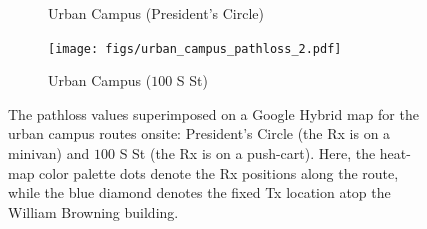 \documentclass[12pt, draftcls, onecolumn]{IEEEtran}
\begin{document}
{\begin{figure} [t]
\begin{subfigure}{0.563\linewidth}
        \caption{Urban Campus (President's Circle)}
        \label{F5a}
    \end{subfigure}
    \begin{subfigure}{0.427\linewidth}
        \centering
        \texttt{[image: figs/urban\_campus\_pathloss\_2.pdf]}
        \caption{Urban Campus ($100$ S St)}
        \label{F5b}
    \end{subfigure}
    \vspace{-8mm}
    \caption{The pathloss values superimposed on a Google Hybrid map for the urban campus routes onsite: President's Circle (the Rx is on a minivan) and $100$ S St (the Rx is on a push-cart). Here, the heat-map color palette dots denote the Rx positions along the route, while the blue diamond denotes the fixed Tx location atop the William Browning building.}
    \label{F5}
\end{figure}

}
\end{document}

